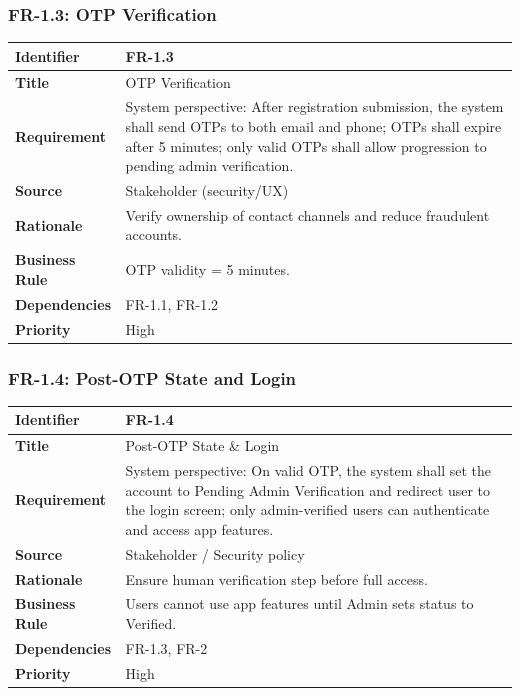 \subsubsection{FR-1.3: OTP Verification}

\begin{longtable}{|p{3cm}|p{12cm}|}
\hline
\rowcolor{lightgray!30}
\textbf{Identifier} & FR-1.3 \\
\hline
\textbf{Title} & OTP Verification \\
\hline
\textbf{Requirement} & System perspective: After registration submission, the system shall send OTPs to both email and phone; OTPs shall expire after 5 minutes; only valid OTPs shall allow progression to pending admin verification. \\
\hline
\textbf{Source} & Stakeholder (security/UX) \\
\hline
\textbf{Rationale} & Verify ownership of contact channels and reduce fraudulent accounts. \\
\hline
\textbf{Business Rule} & OTP validity = 5 minutes. \\
\hline
\textbf{Dependencies} & FR-1.1, FR-1.2 \\
\hline
\textbf{Priority} & High \\
\hline
\end{longtable}

\subsubsection{FR-1.4: Post-OTP State and Login}

\begin{longtable}{|p{3cm}|p{12cm}|}
\hline
\rowcolor{lightgray!30}
\textbf{Identifier} & FR-1.4 \\
\hline
\textbf{Title} & Post-OTP State \& Login \\
\hline
\textbf{Requirement} & System perspective: On valid OTP, the system shall set the account to Pending Admin Verification and redirect user to the login screen; only admin-verified users can authenticate and access app features. \\
\hline
\textbf{Source} & Stakeholder / Security policy \\
\hline
\textbf{Rationale} & Ensure human verification step before full access. \\
\hline
\textbf{Business Rule} & Users cannot use app features until Admin sets status to Verified. \\
\hline
\textbf{Dependencies} & FR-1.3, FR-2 \\
\hline
\textbf{Priority} & High \\
\hline
\end{longtable}

